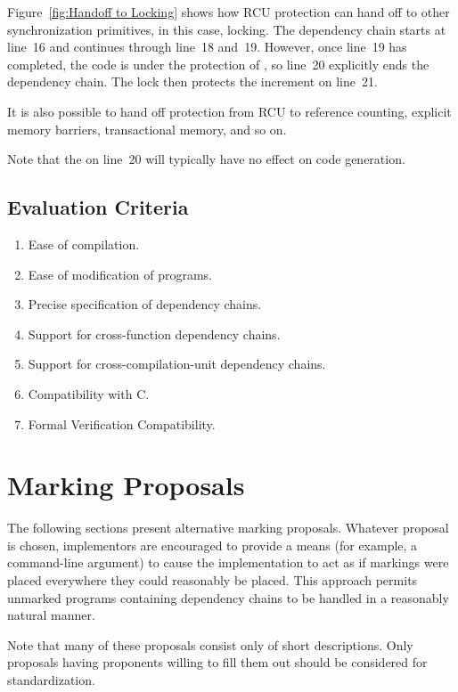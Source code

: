 \documentclass[letterpaper,10pt]{article}
\begin{document}
Figure~\ref{fig:Handoff to Locking}
shows how RCU protection can hand off to other synchronization
primitives, in this case, locking.
The dependency chain starts at line~16 and continues through line~18
and~19.
However, once line~19 has completed, the code is under the protection
of , so line~20 explicitly ends the dependency chain.
The lock then protects the increment on line~21.

It is also possible to hand off protection from RCU to reference counting,
explicit memory barriers, transactional memory, and so on.

Note that the  on line~20 will typically have
no effect on code generation.

\subsection{Evaluation Criteria}
\label{sec:Evaluation Criteria}

\begin{enumerate}
\item	Ease of compilation.
\item	Ease of modification of programs.
\item	Precise specification of dependency chains.
\item	Support for cross-function dependency chains.
\item	Support for cross-compilation-unit dependency chains.
\item	Compatibility with C.
\item	Formal Verification Compatibility.
\end{enumerate}

\section{Marking Proposals}
\label{sec:Marking Proposals}

The following sections present alternative marking proposals.
Whatever proposal is chosen, implementors are encouraged to provide
a means (for example, a command-line argument) to cause the
implementation to act as if markings were placed everywhere they
could reasonably be placed.
This approach permits unmarked programs containing dependency chains
to be handled in a reasonably natural manner.

Note that many of these proposals consist only of short descriptions.
Only proposals having proponents willing to fill them out should be
considered for standardization.
\end{document}

